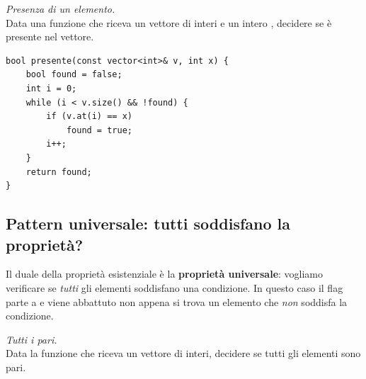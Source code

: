 \begin{problema}
\textit{Presenza di un elemento.}\\
Data una funzione  che riceva un vettore di interi
 e un intero ,
decidere se  \`e presente nel vettore.
\end{problema}


\begin{soluzione}
\begin{codeexample}
  \begin{codebox}
    \begin{lstlisting}
bool presente(const vector<int>& v, int x) {
    bool found = false;
    int i = 0;
    while (i < v.size() && !found) {
        if (v.at(i) == x)
            found = true;
        i++;
    }
    return found;
}
    \end{lstlisting}
  \end{codebox}
\end{codeexample}
\end{soluzione}










\pagebreak 

\subsection{Pattern universale: tutti soddisfano la propriet\`a?}

Il duale della propriet\`a esistenziale \`e la \textbf{propriet\`a universale}:
vogliamo verificare se \emph{tutti} gli elementi soddisfano una condizione.
In questo caso il flag parte a  e viene abbattuto
non appena si trova un elemento che \emph{non} soddisfa la condizione.

\begin{problema}
\textit{Tutti i pari.}\\
Data la funzione  che riceva un vettore di interi,
decidere se tutti gli elementi sono pari.
\end{problema}


